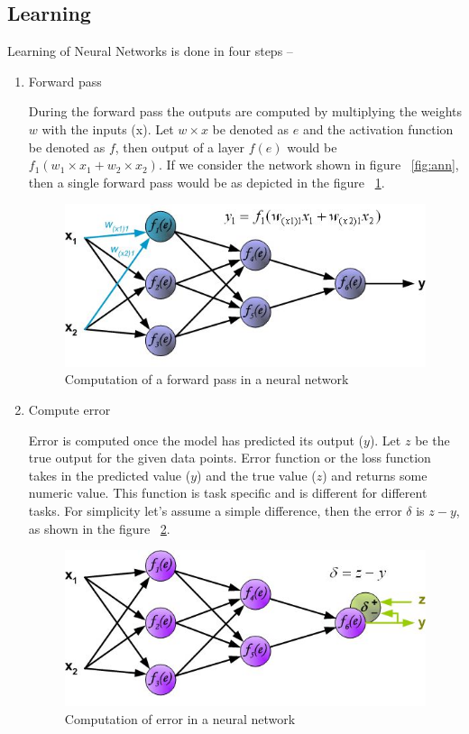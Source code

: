\subsection{Learning \label{lbl:learning}}


Learning of Neural Networks is done in four steps --

\begin{enumerate}
	\item Forward pass

During the forward pass the outputs are computed by multiplying the weights $w$ with the inputs (x). Let $w \times x$ be denoted as $e$ and the activation function be denoted as $f$, then output of a layer $f(e)$ would be $f_1(w_1 \times x_1 + w_2 \times x_2)$. 
If we consider the network shown in figure ~\ref{fig:ann}, then a single forward pass would be as depicted in the figure ~\ref{fig:forward}.

\begin{figure}[H]
	\centering
   \includegraphics[scale=0.66]{figures/intro/forward.bmp}
   \caption[Forward pass]{Computation of a forward pass in a neural network}
   \label{fig:forward}
\end{figure}

	\item Compute error

Error is computed once the model has predicted its output ($y$). Let $z$ be the true output for the given data points. 
Error function or the loss function takes in the predicted value ($y$) and the true value ($z$) and returns some numeric value.
This function is task specific and is different for different tasks. For simplicity let's assume a simple difference, then the error $\delta$ is $z-y$, as shown in the figure ~\ref{fig:error}.

\begin{figure}[H]
	\centering
   \includegraphics[scale=0.66]{figures/intro/error.bmp}
   \caption[Compute error]{Computation of error in a neural network}
   \label{fig:error}
\end{figure}



\end{enumerate}
